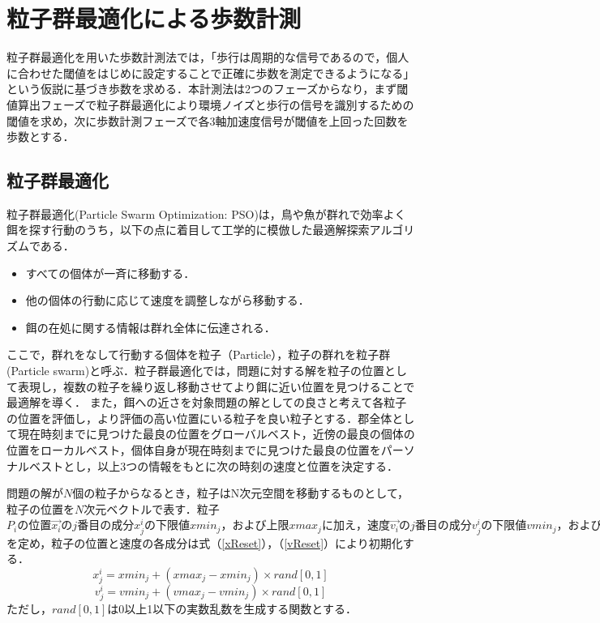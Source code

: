 \chapter{粒子群最適化による歩数計測}
粒子群最適化を用いた歩数計測法では，「歩行は周期的な信号であるので，個人に合わせた閾値をはじめに設定することで正確に歩数を測定できるようになる」という仮説に基づき歩数を求める．本計測法は2つのフェーズからなり，まず閾値算出フェーズで粒子群最適化により環境ノイズと歩行の信号を識別するための閾値を求め，次に歩数計測フェーズで各3軸加速度信号が閾値を上回った回数を歩数とする．

\section{粒子群最適化}
粒子群最適化(Particle Swarm Optimization: PSO)は，鳥や魚が群れで効率よく餌を探す行動のうち，以下の点に着目して工学的に模倣した最適解探索アルゴリズムである．
\begin{itemize}
  \item すべての個体が一斉に移動する．
  \item 他の個体の行動に応じて速度を調整しながら移動する．
  \item 餌の在処に関する情報は群れ全体に伝達される．
\end{itemize}

ここで，群れをなして行動する個体を粒子（Particle），粒子の群れを粒子群(Particle swarm)と呼ぶ．粒子群最適化では，問題に対する解を粒子の位置として表現し，複数の粒子を繰り返し移動させてより餌に近い位置を見つけることで最適解を導く．
また，餌への近さを対象問題の解としての良さと考えて各粒子の位置を評価し，より評価の高い位置にいる粒子を良い粒子とする．郡全体として現在時刻までに見つけた最良の位置をグローバルベスト，近傍の最良の個体の位置をローカルベスト，個体自身が現在時刻までに見つけた最良の位置をパーソナルベストとし，以上3つの情報をもとに次の時刻の速度と位置を決定する．

問題の解が$N$個の粒子からなるとき，粒子はN次元空間を移動するものとして，粒子の位置を$N$次元ベクトルで表す．粒子\begin{math}
  P_{i}の位置\vec{x_{i}}のj番目の成分x^{i}_{j}の下限値xmin_{j}，および上限xmax_{j}に加え，速度\vec{v_{i}}のj番目の成分v^{i}_jの下限値vmin_{j}，および上限値vmax_{j}
 \end{math}を定め，粒子の位置と速度の各成分は式（\ref{xReset}），（\ref{vReset}）により初期化する．
 \begin{equation}
   \label{xReset}
   x^{i}_{j} = xmin_{j} + ( xmax_{j} - xmin_{j} ) \times rand[0,1]
 \end{equation}
 \begin{equation}
   \label{vReset}
   v^{i}_{j} = vmin_{j} + ( vmax_{j} - vmin_{j} ) \times rand[0,1]
 \end{equation}
 ただし，\begin{math}
   rand[0,1]
 \end{math}は0以上1以下の実数乱数を生成する関数とする．

